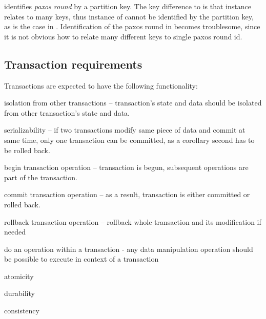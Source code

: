 \lwt identifies \emph{paxos round} by a partition key. The key difference to \lwt is that \mpp instance relates to many keys, thus instance of \mpp cannot be identified by the partition key, as is the case in \lwt. Identification of the paxos round in \mpp becomes troublesome, since it is not obvious how to relate many different keys to single paxos round id. \label{sec:mpp:requirements:identifyRound}





\subsection{Transaction requirements}
Transactions are expected to have the following functionality:

\begin{enumerate*}
\item isolation from other transactions -- transaction's state and data should be isolated from other transaction's state and data.
\item serializability -- if two transactions modify same piece of data and commit at same time, only one transaction can be committed, as a corollary second has to be rolled back.
\item begin transaction operation -- transaction is begun, subsequent operations are part of the transaction. 
\item commit transaction operation -- as a result, transaction is either committed or rolled back.
\item rollback transaction operation -- rollback whole transaction and its modification if needed
\item do an operation within a transaction - any data manipulation operation should be possible to execute in context of a transaction
\item atomicity
\item durability
\item consistency 
\end{enumerate*}


